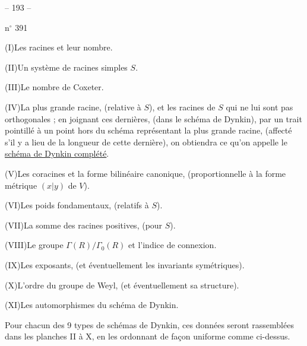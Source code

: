 
\begin{center}-- 193 --\end{center}
\hfill n$^{\circ}$ 391

(I)\quad Les racines et leur nombre.

(II)\quad Un système de racines simples $S$.

(III)\quad Le nombre de Coxeter.

(IV)\quad La plus grande racine, (relative à $S$), et les racines de $S$ qui ne lui
sont pas orthogonales ; en joignant ces dernières, (dans le schéma de Dynkin),
par un trait pointillé à un point hors du schéma représentant la plus grande
racine, (affecté s'il y a lieu de la longueur de cette dernière), on obtiendra
ce qu'on appelle le \uline{schéma de Dynkin complété}.

(V)\quad Les coracines et la forme bilinéaire canonique, (proportionnelle à la
forme métrique $(x|y)$ de $V$).

(VI)\quad Les poids fondamentaux, (relatifs à $S$).

(VII)\quad La somme des racines positives, (pour $S$).

(VIII)\quad Le groupe $\Gamma(R)/\Gamma_0(R)$ et l'indice de connexion.

(IX)\quad Les exposants, (et éventuellement les invariants symétriques).

(X)\quad L'ordre du groupe de Weyl, (et éventuellement sa structure).

(XI)\quad Les automorphismes du schéma de Dynkin.

Pour chacun des 9 types de schémas de Dynkin, ces données seront rassemblées
dans les planches II à X, en les ordonnant de façon uniforme comme ci-dessus.

